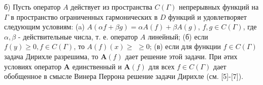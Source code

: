 \documentclass[10pt]{article}
\begin{document}
б) Пусть оператор $A$ действует из пространства $C(\Gamma)$ непрерывных функций на $\Gamma$ в пространство ограниченных гармонических в $D$ функций и удовлетворяет следующим условиям: (a) $A(\alpha f+\beta g)=\alpha A(f)+\beta A(g)$, $f, g \in C(\Gamma)$, где $\alpha, \beta$ - действительные числа, т. е. оператор $A$ линейный; (б) если $f(y) \geqslant 0, f \in C(\Gamma)$, то $A(f)(x) \geqslant$ $\geqslant 0$; (в) если для функции $f \in C(\Gamma)$ задача Дирихле разрешима, то $\boldsymbol{A}(f)$ дает решение этой задачи. При әтих условиях оператор $\boldsymbol{A}$ единственный и $\boldsymbol{A}(f)$ для всех $f \in C(\Gamma)$ дает обобщенное в смысле Винера Перрона решение задачи Дирихле (см. [5]-[7]).
\end{document}

